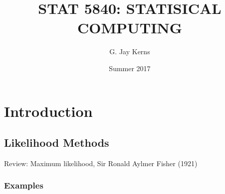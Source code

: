 \documentclass[11pt,english]{scrbook}
\author{G. Jay Kerns}
\date{Summer 2017}
\title{\fontsize{30}{35}\selectfont STAT 5840: STATISICAL COMPUTING}
\begin{document}
\maketitle
\tableofcontents




\chapter{Introduction}
\label{sec:org31042a9}

\section{Likelihood Methods}
\label{sec:orgd149d4a}

Review: Maximum likelihood, Sir Ronald Aylmer Fisher (1921)

\subsection{Examples}
\label{sec:org82fc562}
\end{document}
